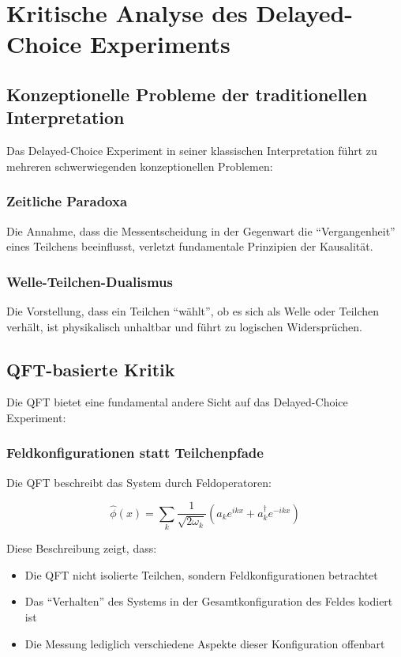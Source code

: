 \documentclass{article}
\begin{document}
	\section{Kritische Analyse des Delayed-Choice Experiments}
	
	\subsection{Konzeptionelle Probleme der traditionellen Interpretation}
	Das Delayed-Choice Experiment in seiner klassischen Interpretation \cite{wheeler1978} führt zu mehreren schwerwiegenden konzeptionellen Problemen:
	
	\subsubsection{Zeitliche Paradoxa}
	Die Annahme, dass die Messentscheidung in der Gegenwart die ``Vergangenheit'' eines Teilchens beeinflusst, verletzt fundamentale Prinzipien der Kausalität.
	
	\subsubsection{Welle-Teilchen-Dualismus}
	Die Vorstellung, dass ein Teilchen ``wählt'', ob es sich als Welle oder Teilchen verhält, ist physikalisch unhaltbar und führt zu logischen Widersprüchen.
	
	\subsection{QFT-basierte Kritik}
	Die QFT bietet eine fundamental andere Sicht auf das Delayed-Choice Experiment:
	
	\subsubsection{Feldkonfigurationen statt Teilchenpfade}
	Die QFT beschreibt das System durch Feldoperatoren:
	
	\begin{equation}
		\hat{\phi}(x) = \sum_k \frac{1}{\sqrt{2\omega_k}}\left(a_k e^{ikx} + a_k^\dagger e^{-ikx}\right)
	\end{equation}
	
	Diese Beschreibung zeigt, dass:
	\begin{itemize}
		\item Die QFT nicht isolierte Teilchen, sondern Feldkonfigurationen betrachtet
		\item Das ``Verhalten'' des Systems in der Gesamtkonfiguration des Feldes kodiert ist
		\item Die Messung lediglich verschiedene Aspekte dieser Konfiguration offenbart
	\end{itemize}
	
\end{document}
